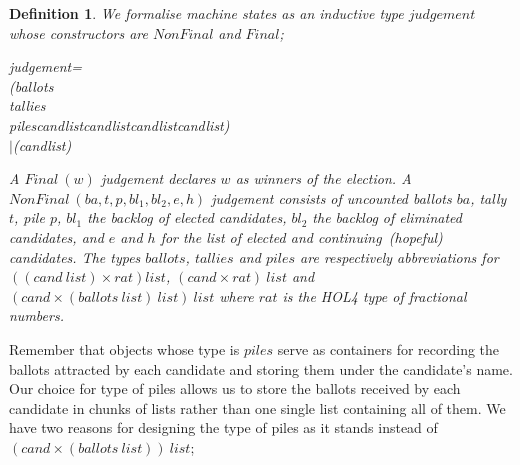 \documentclass[10pt,conference]{IEEEtran}
\renewcommand{\HOLConst}[1]{{\textsf{\upshape #1}}}
\renewcommand{\HOLTyOp}[1]{\textsf{\itshape #1}}
\renewcommand{\HOLTokenBar}{\ensuremath{\mathtt{|}}}
\newtheorem{definition}{Definition}
\begin{document}
\begin{definition}\label{judgement}
We formalise machine states as an inductive type  $\mathit{judgement}$ whose constructors are  $\mathit{NonFinal}$ and $\mathit{Final}$; 
\begin{holthmenv}
\HOLTyOp{judgement}\;=\\
\;\;\;\;\HOLConst{NonFinal}\;(\HOLTyOp{ballots}\;\HOLTokenProd{}\\
\;\;\;\;\;\HOLTyOp{tallies}\;\HOLTokenProd{}\\
\;\;\;\;\;\HOLTyOp{piles}\;\HOLTokenProd{}\;\HOLTyOp{cand}\;\HOLTyOp{list}\;\HOLTokenProd{}\;\HOLTyOp{cand}\;\HOLTyOp{list}\;\HOLTokenProd{}\;\HOLTyOp{cand}\;\HOLTyOp{list}\;\HOLTokenProd{}\;\HOLTyOp{cand}\;\HOLTyOp{list})\\
\;\;\HOLTokenBar{}\;\HOLConst{Final}\;(\HOLTyOp{cand}\;\HOLTyOp{list})
\end{holthmenv}

 A $\mathit{Final~(w)}$ judgement declares $w$ as winners of the election. A  $\mathit{NonFinal~(ba,t,p,bl_{1},bl_{2},e,h)}$ judgement  consists of uncounted ballots $ba$, tally $t$, pile $p$, $bl_{1}$ the backlog of elected candidates, $bl_{2}$ the backlog of eliminated candidates, and $e$ and $h$ for the list of elected and continuing~(hopeful) candidates. The types  $\mathit{ballots}$, $\mathit{tallies}$ and $\mathit{piles}$ are respectively abbreviations for  $\mathit{((cand ~list)\times rat) list}$,   $\mathit{(cand\times rat)~list}$ and $\mathit{(cand\times(ballots~list)~list) ~list}$ where $\mathit{rat}$ is the HOL4 type of fractional numbers.
\end{definition}
 Remember that objects whose type is $\mathit{piles}$ serve as containers for recording the ballots attracted by each candidate and storing them under the candidate's name. Our choice for type of piles allows us to store the ballots received by each candidate in chunks of lists rather than one single list containing all of them.  We have two reasons for designing the type of piles as it stands instead of $\mathit{(cand\times(ballots~list))~list}$;  
\end{document}
